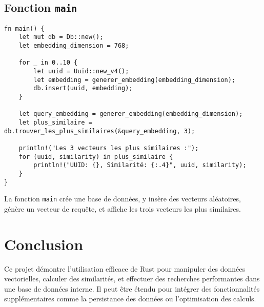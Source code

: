 \documentclass[a4paper,11pt]{article}
\begin{document}
\subsection*{Fonction \texttt{main}}
\begin{verbatim}
fn main() {
    let mut db = Db::new();
    let embedding_dimension = 768;

    for _ in 0..10 {
        let uuid = Uuid::new_v4();
        let embedding = generer_embedding(embedding_dimension);
        db.insert(uuid, embedding);
    }

    let query_embedding = generer_embedding(embedding_dimension);
    let plus_similaire = db.trouver_les_plus_similaires(&query_embedding, 3);

    println!("Les 3 vecteurs les plus similaires :");
    for (uuid, similarity) in plus_similaire {
        println!("UUID: {}, Similarité: {:.4}", uuid, similarity);
    }
}
\end{verbatim}

La fonction \texttt{main} crée une base de données, y insère des vecteurs aléatoires, génère un vecteur de requête, et affiche les trois vecteurs les plus similaires.

\section*{Conclusion}
Ce projet démontre l'utilisation efficace de Rust pour manipuler des données vectorielles, calculer des similarités, et effectuer des recherches performantes dans une base de données interne. Il peut être étendu pour intégrer des fonctionnalités supplémentaires comme la persistance des données ou l'optimisation des calculs.
\end{document}
